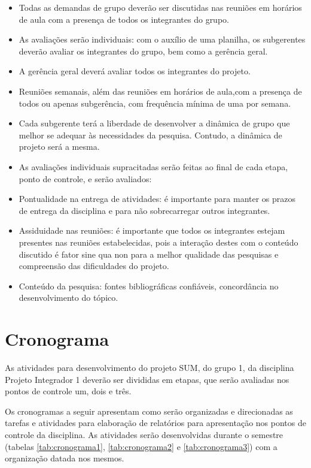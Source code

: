  \begin{itemize}
    \item Todas as demandas de grupo deverão ser discutidas nas reuniões em horários de aula com a presença de todos os integrantes do grupo.
    \item As avaliações serão individuais: com o auxílio de uma planilha, os subgerentes deverão avaliar os integrantes do grupo, bem como a gerência geral.
    \item A gerência geral deverá avaliar todos os integrantes do projeto.
    \item Reuniões semanais, além das reuniões em horários de aula,com a presença de todos ou apenas subgerência, com frequência mínima de uma por semana.
    \item Cada subgerente terá a liberdade de desenvolver a dinâmica de grupo que melhor se adequar às necessidades da pesquisa. Contudo, a dinâmica de projeto será a mesma.
    \item As avaliações individuais supracitadas serão feitas ao final de cada etapa, ponto de controle, e serão avaliados:
    \item Pontualidade na entrega de atividades: é importante para manter os prazos de entrega da disciplina e para não sobrecarregar outros integrantes.
    \item Assiduidade nas reuniões: é importante que todos os integrantes estejam presentes nas reuniões estabelecidas, pois a interação destes com o conteúdo discutido é fator sine qua non para a melhor qualidade das pesquisas e compreensão das dificuldades do projeto.
    \item Conteúdo da pesquisa: fontes bibliográficas confiáveis, concordância no desenvolvimento do tópico.
  \end{itemize}

\section{Cronograma}

As atividades para desenvolvimento do projeto SUM, do grupo 1, da disciplina Projeto Integrador 1 deverão ser divididas em etapas, que serão avaliadas nos pontos de controle um, dois e três.

Os cronogramas a seguir apresentam como serão organizadas e direcionadas  as tarefas e atividades para elaboração de relatórios para apresentação nos pontos de controle da disciplina. As atividades serão desenvolvidas durante o semestre (tabelas \ref{tab:cronograma1}, \ref{tab:cronograma2} e \ref{tab:cronograma3}) com a organização datada nos mesmos.

